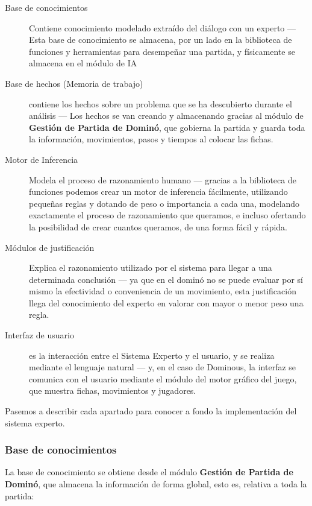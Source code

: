 \begin{description}
    \item[Base de conocimientos] Contiene conocimiento modelado extraído del diálogo con un experto --- Esta base de
        conocimiento se almacena, por un lado en la biblioteca de funciones y herramientas para desempeñar una partida,
        y físicamente se almacena en el módulo de IA
    \item[Base de hechos (Memoria de trabajo)] contiene los hechos sobre un problema que se ha descubierto durante el análisis
        --- Los hechos se van creando y almacenando gracias al módulo de \textbf{Gestión de Partida de Dominó}, que
        gobierna la partida y guarda toda la información, movimientos, pasos y tiempos al colocar las fichas.
    \item[Motor de Inferencia] Modela el proceso de razonamiento humano --- gracias a la biblioteca de funciones podemos
        crear un motor de inferencia fácilmente, utilizando pequeñas reglas y dotando de peso o importancia a cada una,
        modelando exactamente el proceso de razonamiento que queramos, e incluso ofertando la posibilidad de crear
        cuantos queramos, de una forma fácil y rápida.
    \item[Módulos de justificación] Explica el razonamiento utilizado por el sistema para llegar a una determinada conclusión
        --- ya que en el dominó no se puede evaluar por sí mismo la efectividad o conveniencia de un movimiento, esta
        justificación llega del conocimiento del experto en valorar con mayor o menor peso una regla.
    \item[Interfaz de usuario] es la interacción entre el Sistema Experto y el usuario, y se realiza mediante el lenguaje
        natural --- y, en el caso de Dominous, la interfaz se comunica con el usuario mediante el módulo del motor
        gráfico del juego, que muestra fichas, movimientos y jugadores.
\end{description}

Pasemos a describir cada apartado para conocer a fondo la implementación del sistema experto.

\subsubsection{Base de conocimientos}

La base de conocimiento se obtiene desde el módulo \textbf{Gestión de Partida de Dominó}, que almacena la información
de forma global, esto es, relativa a toda la partida:

